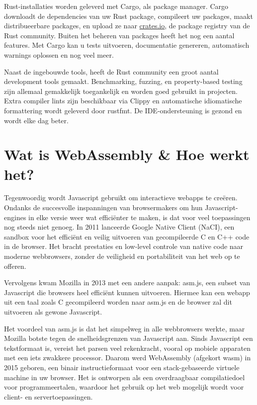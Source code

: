 Rust-installaties worden geleverd met Cargo, als package manager. Cargo downloadt de dependencies
van uw Rust package, compileert uw packages, maakt distribueerbare packages, en upload ze naar
\url{crates.io}, de package registry van de Rust community. Buiten het beheren van packages heeft
het nog een aantal features. Met Cargo kan u tests uitvoeren, documentatie genereren, automatisch
warnings oplossen en nog veel meer.

Naast de ingebouwde tools, heeft de Rust community een groot aantal development tools gemaakt.
Benchmarking, fuzzing, en property-based testing zijn allemaal gemakkelijk toegankelijk en worden
goed gebruikt in projecten. Extra compiler lints zijn beschikbaar via Clippy en automatische
idiomatische formattering wordt geleverd door rustfmt. De IDE-ondersteuning is gezond en wordt elke
dag beter.

\clearpage

\section{Wat is WebAssembly \& Hoe werkt het?}

Tegenwoordig wordt Javascript gebruikt om interactieve webapps te creëren. Ondanks de succesvolle
inspanningen van browsermakers om hun Javascript-engines in elke versie weer wat efficiënter te
maken, is dat voor veel toepassingen nog steeds niet genoeg. In 2011 lanceerde Google Native Client
(NaCI), een sandbox voor het efficiënt en veilig uitvoeren van gecompileerde C en C++ code in de
browser. Het bracht prestaties en low-level controle van native code naar moderne webbrowsers,
zonder de veiligheid en portabiliteit van het web op te offeren. \cite{native_client}

Vervolgens kwam Mozilla in 2013 met een andere aanpak: asm.js, een subset van Javascript die
browsers heel efficiënt kunnen uitvoeren. Hiermee kan een webapp uit een taal zoals C gecompileerd
worden naar asm.js en de browser zal dit uitvoeren als gewone Javascript.

Het voordeel van asm.js is dat het simpelweg in alle webbrowsers werkte, maar Mozilla botste tegen
de snelheidsgrenzen van Javascript aan. Sinds Javascript een tekstformaat is, vereist het parsen
veel rekenkracht, vooral op mobiele apparaten met een iets zwakkere processor. Daarom werd
WebAssembly (afgekort \acrshort{wasm}) in 2015 geboren, een binair instructieformaat voor een
stack-gebaseerde virtuele machine in uw browser. Het is ontworpen als een overdraagbaar
compilatiedoel voor programmeertalen, waardoor het gebruik op het web mogelijk wordt voor client- en
servertoepassingen. \cite{wat_is_wasm}

